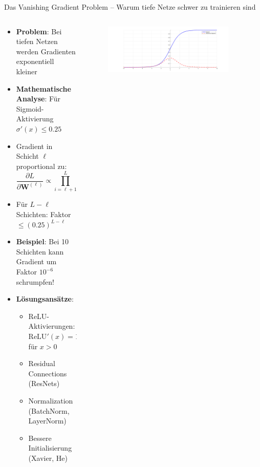 \documentclass[aspectratio=1610, xcolor=dvipsnames, 9pt]{beamer}
\begin{document}
      \begin{frame}{Das Vanishing Gradient Problem -- Warum tiefe Netze schwer zu trainieren sind}
        \begin{columns}
          \begin{column}{0.6\textwidth}
            \begin{itemize}
              \item \textbf{Problem}: Bei tiefen Netzen werden Gradienten exponentiell kleiner
              \item \textbf{Mathematische Analyse}: Für Sigmoid-Aktivierung $\sigma'(x) \leq 0.25$
              \item Gradient in Schicht $\ell$ proportional zu:
              \begin{equation}
                \frac{\partial L}{\partial \mathbf{W}^{(\ell)}} \propto \prod_{i=\ell+1}^{L} \mathbf{W}^{(i)} \sigma'(\mathbf{z}^{(i)})
              \end{equation}
              \item Für $L-\ell$ Schichten: Faktor $\leq (0.25)^{L-\ell}$ 
              \item \textbf{Beispiel}: Bei 10 Schichten kann Gradient um Faktor $10^{-6}$ schrumpfen!
              \item \textbf{Lösungsansätze}:
              \begin{itemize}
                \item ReLU-Aktivierungen: $\text{ReLU}'(x) = 1$ für $x > 0$
                \item Residual Connections (ResNets)
                \item Normalization (BatchNorm, LayerNorm)
                \item Bessere Initialisierung (Xavier, He)
              \end{itemize}
            \end{itemize}
          \end{column}
           \begin{column}{0.4\textwidth}
             \begin{figure}
               \centering
                           \includegraphics[width=0.9\textwidth]{images/sigmoid.png}
               \end{figure}
           \end{column}
        \end{columns}
      \end{frame}
\end{document}
